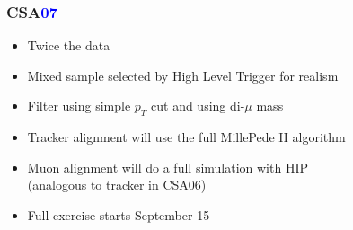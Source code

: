 \documentclass[compress]{beamer}
\begin{document}
\begin{frame}
\frametitle{CSA\textcolor{blue}{07}}
\begin{itemize}\setlength{\itemsep}{0.5 cm}
\item Twice the data
\item Mixed sample selected by High Level Trigger for realism
\item Filter using simple $p_T$ cut and using di-$\mu$ mass
\item Tracker alignment will use the full MillePede II algorithm
\item Muon alignment will do a full simulation with HIP \\
(analogous to tracker in CSA06)
\item Full exercise starts September 15
\end{itemize}
\end{frame}
\end{document}
